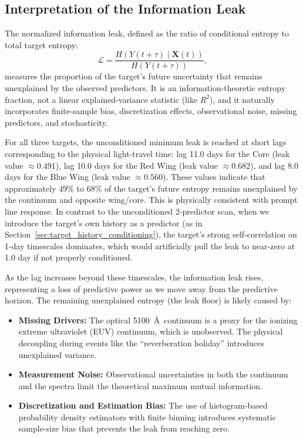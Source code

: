 \documentclass[fleqn,usenatbib]{mnras}
\begin{document}
\subsection{Interpretation of the Information Leak}

The normalized information leak, defined as the ratio of conditional entropy to total target entropy:
\begin{equation}
\mathcal{L} = \frac{H(Y(t+\tau) \mid \mathbf{X}(t))}{H(Y(t+\tau))},
\end{equation}
measures the proportion of the target's future uncertainty that remains unexplained by the observed predictors. It is an information-theoretic entropy fraction, not a linear explained-variance statistic (like $R^2$), and it naturally incorporates finite-sample bias, discretization effects, observational noise, missing predictors, and stochasticity.

For all three targets, the unconditioned minimum leak is reached at short lags corresponding to the physical light-travel time: lag 11.0 days for the Core (leak value $\approx 0.491$), lag 10.0 days for the Red Wing (leak value $\approx 0.682$), and lag 8.0 days for the Blue Wing (leak value $\approx 0.560$). These values indicate that approximately $49\%$ to $68\%$ of the target's future entropy remains unexplained by the continuum and opposite wing/core. This is physically consistent with prompt line response. In contrast to the unconditioned 2-predictor scan, when we introduce the target's own history as a predictor (as in Section~\ref{sec:target_history_conditioning}), the target's strong self-correlation on 1-day timescales dominates, which would artificially pull the leak to near-zero at 1.0 day if not properly conditioned.

As the lag increases beyond these timescales, the information leak rises, representing a loss of predictive power as we move away from the predictive horizon. The remaining unexplained entropy (the leak floor) is likely caused by:
\begin{itemize}
\item \textbf{Missing Drivers:} The optical 5100~\AA\ continuum is a proxy for the ionizing extreme ultraviolet (EUV) continuum, which is unobserved. The physical decoupling during events like the ``reverberation holiday'' introduces unexplained variance.
\item \textbf{Measurement Noise:} Observational uncertainties in both the continuum and the spectra limit the theoretical maximum mutual information.
\item \textbf{Discretization and Estimation Bias:} The use of histogram-based probability density estimators with finite binning introduces systematic sample-size bias that prevents the leak from reaching zero.
\end{itemize}
\end{document}
